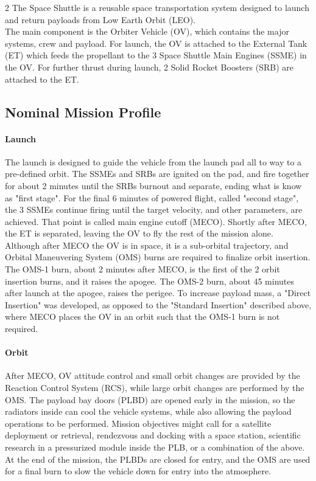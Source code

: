 \documentclass[Space_Shuttle_Vessel_Manual.tex]{subfiles}
\begin{document}
\begin{multicols*}{2}
\noindent
The Space Shuttle is a reusable space transportation system designed to launch and return payloads from Low Earth Orbit (LEO).\\
The main component is the Orbiter Vehicle (OV), which contains the major systems, crew and payload. For launch, the OV is attached to the External Tank (ET) which feeds the propellant to the 3 Space Shuttle Main Engines (SSME) in the OV. For further thrust during launch, 2 Solid Rocket Boosters (SRB) are attached to the ET.\\


\newpage

\subsection{Nominal Mission Profile}
\paragraph{Launch}
The launch is designed to guide the vehicle from the launch pad all to way to a pre-defined orbit. The SSMEs and SRBs are ignited on the pad, and fire together for about 2 minutes until the SRBs burnout and separate, ending what is know as "first stage". For the final 6 minutes of powered flight, called "second stage", the 3 SSMEs continue firing until the target velocity, and other parameters, are achieved. That point is called main engine cutoff (MECO). Shortly after MECO, the ET is separated, leaving the OV to fly the rest of the mission alone.\\
Although after MECO the OV is in space, it is a sub-orbital trajectory, and Orbital Maneuvering System (OMS) burns are required to finalize orbit insertion. The OMS-1 burn, about 2 minutes after MECO, is the first of the 2 orbit insertion burns, and it raises the apogee. The OMS-2 burn, about 45 minutes after launch at the apogee, raises the perigee. To increase payload mass, a "Direct Insertion" was developed, as opposed to the "Standard Insertion" described above, where MECO places the OV in an orbit such that the OMS-1 burn is not required.

\paragraph{Orbit}
After MECO, OV attitude control and small orbit changes are provided by the Reaction Control System (RCS), while large orbit changes are performed by the OMS.
The payload bay doors (PLBD) are opened early in the mission, so the radiators inside can cool the vehicle systems, while also allowing the payload operations to be performed. Mission objectives might call for a satellite deployment or retrieval, rendezvous and docking with a space station, scientific research in a pressurized module inside the PLB, or a combination of the above.
At the end of the mission, the PLBDs are closed for entry, and the OMS are used for a final burn to slow the vehicle down for entry into the atmosphere.


\end{multicols*}
\end{document}

